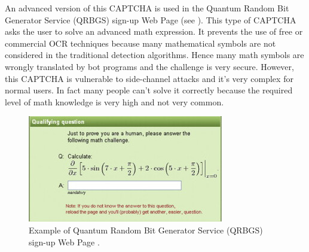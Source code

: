 An advanced version of this CAPTCHA is used in the Quantum Random Bit Generator Service (QRBGS) sign-up Web Page\cite{math_CAPTCHA} (see ). This type of CAPTCHA asks the user to solve an advanced math expression. It prevents the use of free or commercial OCR techniques because many mathematical symbols are not considered in the traditional detection algorithms. Hence many math symbols are wrongly translated by bot programs and the challenge is very secure. However, this CAPTCHA is vulnerable to side-channel attacks \cite{math_CAPTCHA} and it's very complex for normal users. In fact many people can't solve it correctly because the required level of math knowledge is very high and not very common.
\begin{figure}[h]
     \centering
     \includegraphics[width=.4\linewidth]{Images/StateOfArt/QRBGS}
     \caption{\footnotesize{Example of Quantum Random Bit Generator Service (QRBGS) sign-up Web Page \cite{math_CAPTCHA}.}}\label{soa:QRBGS}
\end{figure}

